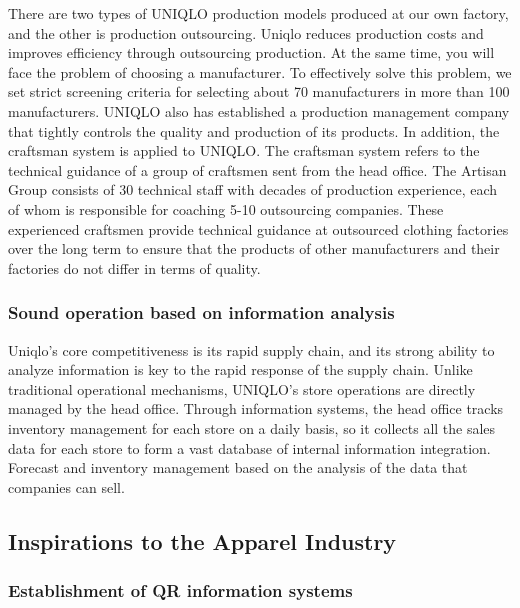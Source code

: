 \documentclass[12pt,]{article}
\begin{document}
There are two types of UNIQLO production models produced at our own
factory, and the other is production outsourcing. Uniqlo reduces
production costs and improves efficiency through outsourcing production.
At the same time, you will face the problem of choosing a manufacturer.
To effectively solve this problem, we set strict screening criteria for
selecting about 70 manufacturers in more than 100 manufacturers. UNIQLO
also has established a production management company that tightly
controls the quality and production of its products. In addition, the
craftsman system is applied to UNIQLO. The craftsman system refers to
the technical guidance of a group of craftsmen sent from the head
office. The Artisan Group consists of 30 technical staff with decades of
production experience, each of whom is responsible for coaching 5-10
outsourcing companies. These experienced craftsmen provide technical
guidance at outsourced clothing factories over the long term to ensure
that the products of other manufacturers and their factories do not
differ in terms of quality.

\hypertarget{sound-operation-based-on-information-analysis}{%
\subsubsection{Sound operation based on information
analysis}\label{sound-operation-based-on-information-analysis}}

Uniqlo's core competitiveness is its rapid supply chain, and its strong
ability to analyze information is key to the rapid response of the
supply chain. Unlike traditional operational mechanisms, UNIQLO's store
operations are directly managed by the head office. Through information
systems, the head office tracks inventory management for each store on a
daily basis, so it collects all the sales data for each store to form a
vast database of internal information integration. Forecast and
inventory management based on the analysis of the data that companies
can sell.

\hypertarget{inspirations-to-the-apparel-industry}{%
\subsection{Inspirations to the Apparel
Industry}\label{inspirations-to-the-apparel-industry}}

\hypertarget{establishment-of-qr-information-systems}{%
\subsubsection{Establishment of QR information
systems}\label{establishment-of-qr-information-systems}}
\end{document}
